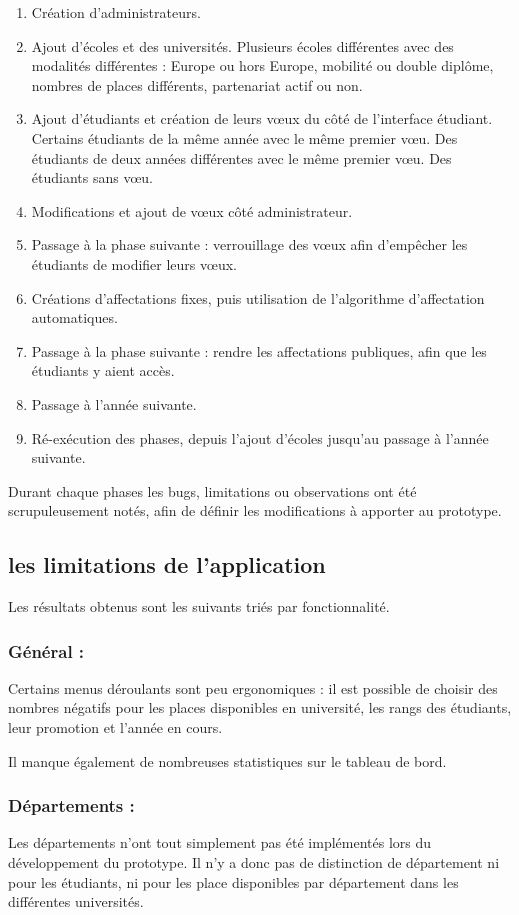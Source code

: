 \begin{enumerate}
\item Création d'administrateurs.
\item Ajout d'écoles et des universités. Plusieurs écoles différentes avec des modalités différentes : Europe ou hors Europe, mobilité ou double diplôme, nombres de places différents, partenariat actif ou non.
\item Ajout d'étudiants et création de leurs vœux du côté de l'interface étudiant. Certains étudiants de la même année avec le même premier vœu. Des étudiants de deux années différentes avec le même premier vœu. Des étudiants sans vœu.
\item Modifications et ajout de vœux côté administrateur.
\item Passage à la phase suivante : verrouillage des vœux afin d'empêcher les étudiants de modifier leurs vœux.
\item Créations d'affectations fixes, puis utilisation de l'algorithme d'affectation automatiques.
\item Passage à la phase suivante : rendre les affectations publiques, afin que les étudiants y aient accès. 
\item Passage à l'année suivante.
\item Ré-exécution des phases, depuis l'ajout d'écoles jusqu'au passage à l'année suivante.
\end{enumerate}


Durant chaque phases les bugs, limitations ou observations ont été scrupuleusement notés, afin de définir les modifications à apporter au prototype.


\subsection{les limitations de l'application}

Les résultats obtenus sont les suivants triés par fonctionnalité.

\subsubsection{Général :}
Certains menus déroulants sont peu ergonomiques : il est possible de choisir des nombres négatifs pour les places disponibles en université, les rangs des étudiants, leur promotion et l'année en cours.

Il manque également de nombreuses statistiques sur le tableau de bord.

\subsubsection{Départements :}
Les départements n'ont tout simplement pas été implémentés lors du développement du prototype. Il n'y a donc pas de distinction de département ni pour les étudiants, ni pour les place disponibles par département dans les différentes universités.


